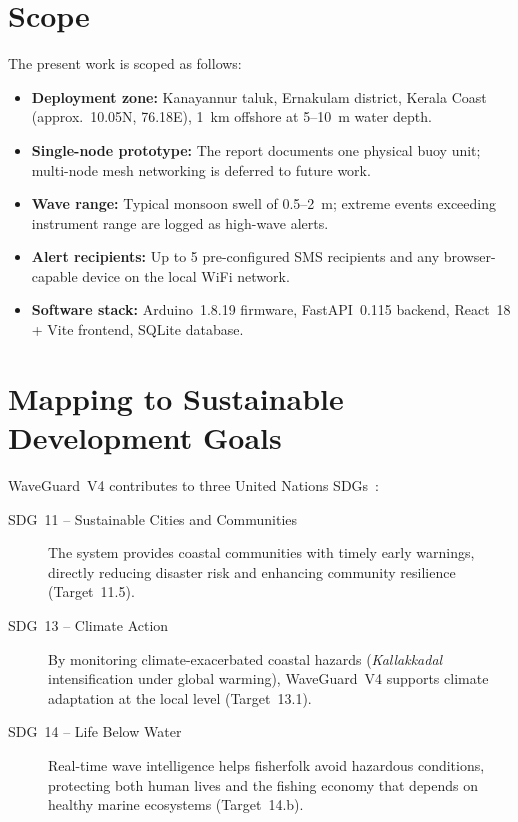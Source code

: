 \section{Scope}

The present work is scoped as follows:

\begin{itemize}
  \item \textbf{Deployment zone:} Kanayannur taluk, Ernakulam district, Kerala Coast
        (approx.\ 10.05\textdegree{}N, 76.18\textdegree{}E), 1~km offshore at
        5--10~m water depth.
  \item \textbf{Single-node prototype:} The report documents one physical buoy unit;
        multi-node mesh networking is deferred to future work.
  \item \textbf{Wave range:} Typical monsoon swell of 0.5--2~m; extreme events
        exceeding instrument range are logged as high-wave alerts.
  \item \textbf{Alert recipients:} Up to 5 pre-configured SMS recipients and any
        browser-capable device on the local WiFi network.
  \item \textbf{Software stack:} Arduino~1.8.19 firmware, FastAPI~0.115 backend,
        React~18 + Vite frontend, SQLite database.
\end{itemize}

\section{Mapping to Sustainable Development Goals}

WaveGuard~V4 contributes to three United Nations SDGs~\cite{un2015sdgs}:

\begin{description}
  \item[SDG~11 – Sustainable Cities and Communities]
        The system provides coastal communities with timely early warnings, directly
        reducing disaster risk and enhancing community resilience (Target~11.5).

  \item[SDG~13 – Climate Action]
        By monitoring climate-exacerbated coastal hazards (\textit{Kallakkadal}
        intensification under global warming), WaveGuard~V4 supports climate
        adaptation at the local level (Target~13.1).

  \item[SDG~14 – Life Below Water]
        Real-time wave intelligence helps fisherfolk avoid hazardous conditions,
        protecting both human lives and the fishing economy that depends on
        healthy marine ecosystems (Target~14.b).
\end{description}

